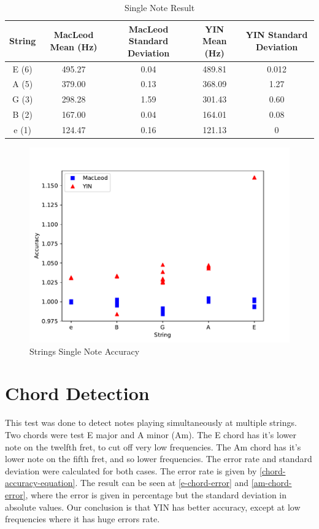 \begin{table}[htb]
  \begin{center}
    \ABNTEXreducedfont
    \caption[Single Note Result]{Single Note Result}
    \label{single-note-result}
    \begin{tabular}{c | c | c | c | c}
      \hline
      String & MacLeod Mean (Hz) & MacLeod Standard Deviation & YIN Mean (Hz) & YIN Standard Deviation\\
      \hline \hline
      E (6) & 495.27 & 0.04 & 489.81 & 0.012 \\ \hline
      A (5) & 379.00 & 0.13 & 368.09 & 1.27 \\ \hline
      G (3) & 298.28 & 1.59 & 301.43 & 0.60 \\ \hline
      B (2) & 167.00 & 0.04 & 164.01 & 0.08 \\ \hline
      e (1) & 124.47 & 0.16 & 121.13 & 0 \\ \hline
    \end{tabular}
  \end{center}
\end{table}


\begin{figure}[!htpb]
  \centering
  \caption{Strings Single Note Accuracy}
  \label{single-note-accuracy}
  \includegraphics[scale=0.85]{images/measurements/single-note-acc-2}
\end{figure}

\section{Chord Detection}
This test was done to detect notes playing simultaneously at multiple strings.
Two chords were test E major and A minor (Am). The E chord has it's lower note on
the twelfth fret, to cut off very low frequencies. The Am chord has it's lower note
on the fifth fret, and so lower frequencies.
The error rate and standard deviation were calculated for both cases. The error rate is given by
\autoref{chord-accuracy-equation}. The result can be seen at \autoref{e-chord-error} and \autoref{am-chord-error}, where the
error is given in percentage but the standard deviation in absolute values.
Our conclusion is that YIN has better accuracy, except at low frequencies where it
has huge errors rate.

